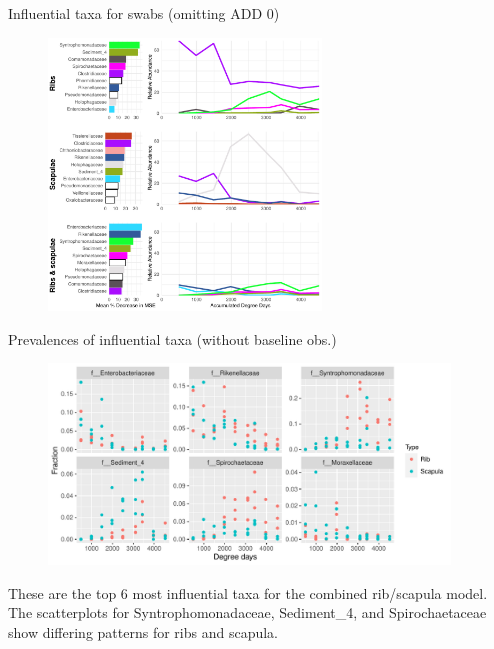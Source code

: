 \documentclass{beamer}
\begin{document}
\begin{frame}{Influential taxa for swabs (omitting ADD 0)}

  \begin{center}
    \begin{figure}
      \includegraphics[height=2.85in]
        {w_swabs/bacteria/use_families/hl_combined_family_no_baseline_6panels}
    \end{figure}
  \end{center}

\end{frame}



\begin{frame}{Prevalences of influential taxa (without baseline obs.)}

  \begin{center}
    \begin{figure}
      \includegraphics[height=2.1in]
        {w_swabs/bacteria/use_families/both_ribs_scapulae/no_baseline/infl_combined_swab_no_baseline_family_scatter}
    \end{figure}
  \end{center}

  \vspace{0.15in}

  \footnotesize{ \noindent These are the top 6 most influential taxa for the
    combined rib/scapula model.  The scatterplots for Syntrophomonadaceae,
    Sediment\_4, and Spirochaetaceae show differing patterns for ribs and
    scapula.
    }

\end{frame}
\end{document}
